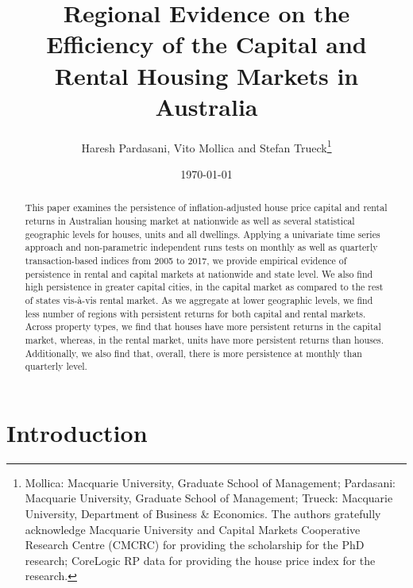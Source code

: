 \documentclass[AEJ,reqno, draftmode]{AEA}
\begin{document}
\title{Regional Evidence on the Efficiency of the Capital and Rental Housing Markets in Australia}
\author{Haresh Pardasani, Vito Mollica and Stefan Trueck\thanks{%
Mollica: Macquarie University, Graduate School of Management; Pardasani: Macquarie University, Graduate School of Management; Trueck: Macquarie University, Department of Business \& Economics. The authors gratefully acknowledge Macquarie University and Capital Markets Cooperative Research Centre (CMCRC) for providing the scholarship for the PhD research; CoreLogic RP data for providing the house price index for the research.}}
\date{\today}
\pubVolume{}
\pubIssue{}
\JEL{}

\begin{abstract}
This paper examines the persistence of inflation-adjusted house price capital and rental returns in Australian housing market at nationwide as well as several statistical geographic levels for houses, units and all dwellings. Applying a univariate time series approach and non-parametric independent runs tests on monthly as well as quarterly transaction-based indices from 2005 to 2017, we provide empirical evidence of persistence in rental and capital markets at nationwide and state level. We also find high persistence in greater capital cities, in the capital market as compared to the rest of states vis-à-vis rental market. As we aggregate at lower geographic levels, we find less number of regions with persistent returns for both capital and rental markets. Across property types, we find that houses have more persistent returns in the capital market, whereas, in the rental market, units have more persistent returns than houses. Additionally, we also find that, overall, there is more persistence at monthly than quarterly level. \\

\end{abstract}

\maketitle

\section{Introduction}

\end{document}
